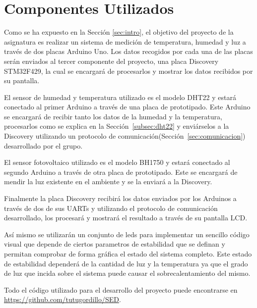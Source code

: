 \section{Componentes Utilizados}\label{sec:arquitectura}

Como se ha expuesto en la Secci\'on \ref{sec:intro}, el objetivo del
proyecto de la asignatura es realizar un sistema de medici\'on de
temperatura, humedad y luz a trav\'es de dos placas Arduino Uno. Los
datos recogidos por cada una de las placas ser\'an enviados al tercer
componente del proyecto, una placa Discovery STM32F429, la cual se
encargar\'a de procesarlos y mostrar los datos recibidos por su
pantalla.

El sensor de humedad y temperatura utilizado es el modelo DHT22 y
estar\'a conectado al primer Arduino a trav\'es de una placa de
prototipado. Este Arduino se encargar\'a de recibir tanto los datos de
la humedad y la temperatura, procesarlos como se explica en la
Secci\'on~\ref{subsec:dht22} y envi\'arselos a la Discovery utilizando
un protocolo de comunicaci\'on(Secci\'on~\ref{sec:comunicacion}) desarrollado por el grupo.

El sensor fotovoltaico utilizado es el modelo BH1750 y estar\'a
conectado al segundo Arduino a trav\'es de otra placa de
prototipado. Este se encargar\'a de mendir la luz existente en el
ambiente y se la enviar\'a a la Discovery.

Finalmente la placa Discovery recibir\'a los datos enviados por los
Arduinos a trav\'es de dos de sus UARTs y utilizando el protocolo de
comunicaci\'on desarrollado, los procesar\'a y mostrar\'a el resultado
a trav\'es de su pantalla LCD.

As\'i mismo se utilizar\'an un conjunto de leds para implementar un
sencillo c\'odigo visual que depende de ciertos parametros de
estabilidad que se definan y permitan comprobar de forma gr\'afica el
estado del sistema completo. Este estado de estabilidad depender\'a de
la cantidad de luz y la temperatura ya que el grado de luz que incida
sobre el sistema puede causar el sobrecalentamiento del mismo.

Todo el c\'odigo utilizado para el desarrollo del proyecto puede
encontrarse en \url{https://github.com/tutugordillo/SED}.
